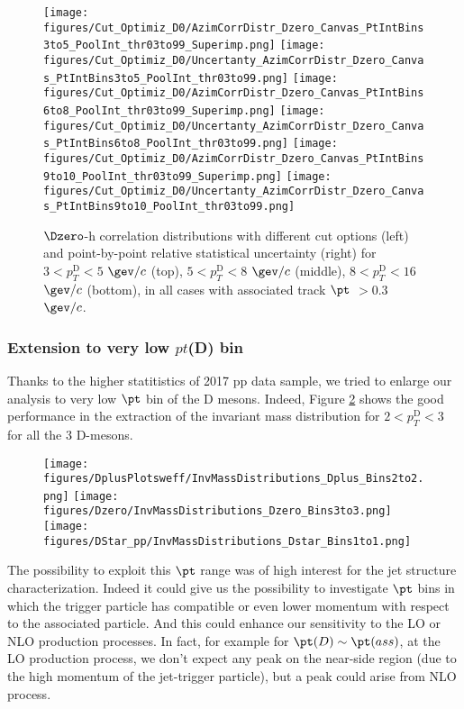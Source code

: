 \begin{figure}[!htp]
\centering
{\texttt{[image: figures/Cut\_Optimiz\_D0/AzimCorrDistr\_Dzero\_Canvas\_PtIntBins3to5\_PoolInt\_thr03to99\_Superimp.png]}}
{\texttt{[image: figures/Cut\_Optimiz\_D0/Uncertanty\_AzimCorrDistr\_Dzero\_Canvas\_PtIntBins3to5\_PoolInt\_thr03to99.png]}}
{\texttt{[image: figures/Cut\_Optimiz\_D0/AzimCorrDistr\_Dzero\_Canvas\_PtIntBins6to8\_PoolInt\_thr03to99\_Superimp.png]}}
{\texttt{[image: figures/Cut\_Optimiz\_D0/Uncertanty\_AzimCorrDistr\_Dzero\_Canvas\_PtIntBins6to8\_PoolInt\_thr03to99.png]}}
{\texttt{[image: figures/Cut\_Optimiz\_D0/AzimCorrDistr\_Dzero\_Canvas\_PtIntBins9to10\_PoolInt\_thr03to99\_Superimp.png]}}
{\texttt{[image: figures/Cut\_Optimiz\_D0/Uncertanty\_AzimCorrDistr\_Dzero\_Canvas\_PtIntBins9to10\_PoolInt\_thr03to99.png]}}

\caption{$\Dzero$-h correlation distributions with different cut options (left) and point-by-point relative statistical uncertainty (right) for $3< p_{T}^{\text{D}}< 5$ $\gev/c$ (top), $5< p_{T}^{\text{D}}< 8$ $\gev/c$ (middle), $8< p_{T}^{\text{D}}< 16$ $\gev/c$ (bottom), in all cases with associated track $\pt$ $> 0.3$ $\gev/c$.}
\label{fig:cutoptD0}
\end{figure}

\subsubsection{Extension to very low $pt$(D) bin}

Thanks to the higher statitistics of 2017 pp data sample, we tried to enlarge our analysis to very low $\pt$ bin of the D mesons.
Indeed, Figure \ref{fig:veryLowPt} shows the good performance in the extraction of the invariant mass distribution for $2< p_{T}^{\text{D}}< 3$ for all the 3 D-mesons. 


\begin{figure}[h]
\centering
{\texttt{[image: figures/DplusPlotsweff/InvMassDistributions\_Dplus\_Bins2to2.png]}}
{\texttt{[image: figures/Dzero/InvMassDistributions\_Dzero\_Bins3to3.png]}}
{\texttt{[image: figures/DStar\_pp/InvMassDistributions\_Dstar\_Bins1to1.png]}}
\label{fig:veryLowPt}
\end{figure}

The possibility to exploit this $\pt$ range was of high interest for the jet structure characterization. Indeed it could give us the possibility to investigate $\pt$ bins in which the trigger particle has compatible or even lower momentum with respect to the associated particle. And this could enhance our sensitivity to the LO or NLO production processes. In fact, for example for $\pt (D)\sim \pt(ass)$, at the LO production process, we don't expect any peak on the near-side region (due to the high momentum of the jet-trigger particle), but a peak could arise from NLO process.

